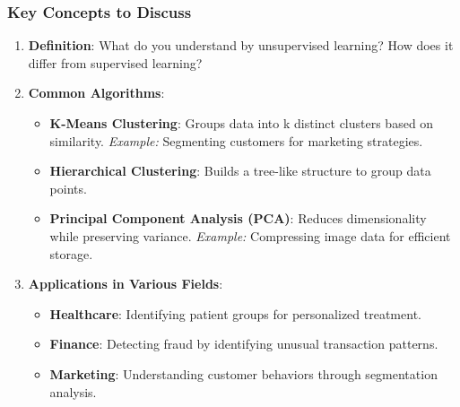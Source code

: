\documentclass[aspectratio=169]{beamer}
\begin{document}
\begin{frame}[fragile]
    \frametitle{Key Concepts to Discuss}
    \begin{enumerate}
        \item \textbf{Definition}: What do you understand by unsupervised learning? How does it differ from supervised learning?
        
        \item \textbf{Common Algorithms}:
        \begin{itemize}
            \item \textbf{K-Means Clustering}: Groups data into k distinct clusters based on similarity. \textit{Example:} Segmenting customers for marketing strategies.
            \item \textbf{Hierarchical Clustering}: Builds a tree-like structure to group data points.
            \item \textbf{Principal Component Analysis (PCA)}: Reduces dimensionality while preserving variance. \textit{Example:} Compressing image data for efficient storage.
        \end{itemize}
        
        \item \textbf{Applications in Various Fields}:
        \begin{itemize}
            \item \textbf{Healthcare}: Identifying patient groups for personalized treatment.
            \item \textbf{Finance}: Detecting fraud by identifying unusual transaction patterns.
            \item \textbf{Marketing}: Understanding customer behaviors through segmentation analysis.
        \end{itemize}
    \end{enumerate}
\end{frame}
\end{document}

